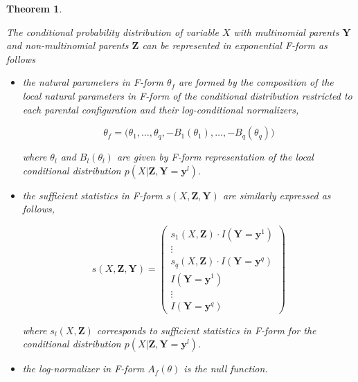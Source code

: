 \documentclass[11pt, oneside]{article}   	%
\newtheorem{theorem}{Theorem}
\newcommand{\bm}{\mathbf}
\numberwithin{figure}{section}
\numberwithin{equation}{section}
\numberwithin{table}{section}
\theoremstyle{definition}
\begin{document}
\begin{theorem}\label{thm:representation:multiparents}

The conditional probability distribution of variable $X$ with multinomial parents $\bm Y$ and non-multinomial parents $\bm Z$ can be represented in exponential \textit{F-form} as follows

\begin{itemize}
\item the natural parameters  in F-form $\theta_f$ are formed by the composition of the local natural parameters in F-form of the conditional distribution restricted to each parental configuration and their log-conditional normalizers, 

$$\theta_f = \big(\theta_{1},\ldots,\theta_{q},-B_1(\theta_{1}), \ldots,-B_q(\theta_{q})\big)$$

\noindent where $\theta_l$ and $B_l(\theta_l)$ are given by F-form representation of the local conditional distribution $p(X | \bm Z, \bm Y = \mathbf{y}^l)$. 


\item the sufficient statistics in F-form $s(X,\bm Z, \bm Y)$ are similarly expressed as follows, 

$$
s(X,\bm Z, \bm Y) = 
\begin{pmatrix}
s_1(X, \bm Z) \cdot I(\mathbf{Y} =\mathbf{y}^1) \\
\vdots \\
s_q(X, \bm Z) \cdot I(\mathbf{Y} =\mathbf{y}^q)\\
I(\mathbf{Y} =\mathbf{y}^1) \\
\vdots \\
I(\mathbf{Y} =\mathbf{y}^q)
\end{pmatrix}
$$


\noindent where $s_l(X, \bm Z)$ corresponds to sufficient statistics in F-form for the conditional distribution $p(X | \bm Z, \bm Y = \mathbf{y}^l)$.

\item the log-normalizer in F-form $A_f(\theta)$ is the null function.

\end{itemize}

\end{theorem}
\end{document}
